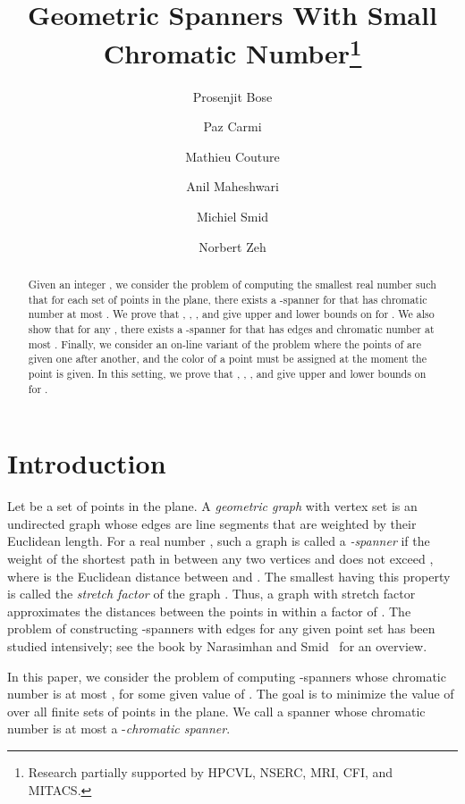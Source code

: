 \documentclass[pdftex,leqno,fleqn,12pts]{llncs}
\begin{document}
\title{Geometric Spanners With Small Chromatic 
   Number\thanks{Research partially supported by HPCVL, NSERC, MRI, 
                 CFI, and MITACS.}}
\author{Prosenjit Bose \and Paz Carmi \and Mathieu Couture \and 
Anil Maheshwari \and Michiel Smid \and Norbert Zeh}


\maketitle

\begin{abstract} 
Given an integer , we consider the problem of computing the smallest real number 
 such that for each set  of points in the plane, there exists a -spanner for 
 that has chromatic number at most . 
We prove that , , , and give upper and lower bounds on 
 for . 
We also show that for any , there exists a -spanner for  
that has  edges and chromatic number at most .
Finally, we consider an on-line variant of the problem where the points of  are given one after 
another, and the color of a point must be assigned at the moment the point is given.
In this setting, we prove that , , , and give 
upper and lower bounds on  for . 
\end{abstract}





\section{Introduction} 
Let  be a set of  points in the plane. A \emph{geometric graph} 
with vertex set  is an undirected graph whose edges are line segments 
that are weighted by their Euclidean length. For a real number , 
such a graph  is called a \emph{-spanner} if the weight of the 
shortest path in  between any two vertices  and  does not exceed 
, where  is the Euclidean distance between  and . 
The smallest  having this property is called the \emph{stretch factor} 
of the graph . Thus, a graph with stretch factor  approximates the 
 distances between the points in  within a factor of . 
The problem of constructing -spanners with  edges for any given 
point set has been studied intensively; see the book by 
Narasimhan and Smid~\cite{smid07} for an overview. 

In this paper, we consider the problem of computing -spanners whose 
chromatic number is at most , for some given value of . The 
goal is to minimize the value of  over all finite sets  of 
points in the plane. We call a spanner whose chromatic number is at most 
 a -\emph{chromatic spanner}.
\end{document}
